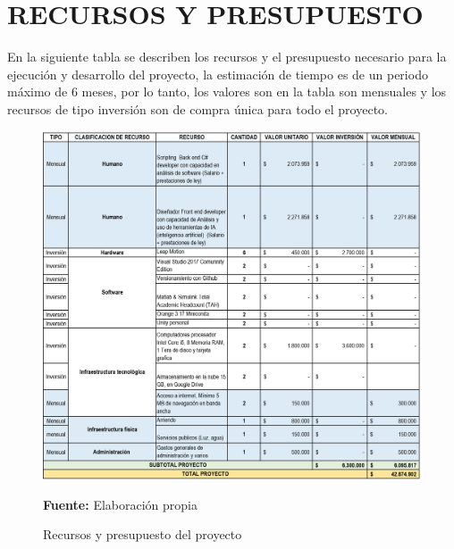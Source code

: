 \chapter{RECURSOS Y PRESUPUESTO}
En la siguiente tabla se describen los recursos y el presupuesto necesario para la ejecución y desarrollo del proyecto, la estimación de tiempo es de un periodo máximo de 6 meses, por lo tanto, los valores son en la tabla son mensuales y los recursos de tipo inversión son de compra única para todo el proyecto. 

\begin{figure}[H]
    \centering
    \includegraphics[width=1\textwidth]{Anexos/LATEX/chapters/images/Presupuesto.jpg}
    \caption{Recursos y presupuesto del proyecto}
    \small{\textbf{Fuente:} Elaboración propia}
    \label{RECURSOS}
\end{figure}